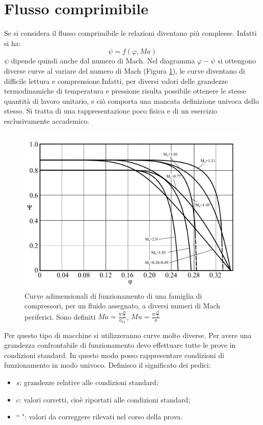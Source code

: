\section{Flusso comprimibile}
Se si considera il flusso comprimibile le relazioni diventano più complesse. Infatti si ha:
\begin{equation}
\psi=f(\varphi,Ma)
\end{equation}
$\psi$ dipende quindi anche dal numero di Mach. 
Nel diagramma $\varphi-\psi$ si ottengono diverse curve al variare del numero di Mach (Figura \ref{fig:ComprMach}), le curve diventano di difficile lettura e comprensione.Infatti, per diversi valori delle grandezze termodinamiche di temperatura e pressione risulta possibile ottenere le stesse quantità di lavoro unitario, e ciò comporta una mancata definizione univoca dello stesso. Si tratta di una rappresentazione poco fisica e di un esercizio esclusivamente accademico.
\begin{figure}[h!]
\centering
  \includegraphics[width=.85\textwidth]{fig/ComprMach.pdf}
\caption{Curve adimensionali di funzionamento di una famiglia di compressori, per un fluido assegnato, a diversi numeri di Mach periferici. Sono definiti $Ma = \frac{w \frac{D}{2}}{a_{01}}$, $Mu = \frac{w \frac{D}{2}}{a}$}
\label{fig:ComprMach}
\end{figure}
Per questo tipo di macchine si utilizzeranno curve molto diverse. Per avere una grandezza confrontabile di funzionamento devo effettuare tutte le prove in condizioni standard. In questo modo posso rappresentare condizioni di funzionamento in modo univoco. 
Definisco il significato dei pedici:
\begin{itemize}
\item $s$: grandezze relative alle condizioni standard;
\item $c$: valori corretti, cioè riportati alle condizioni standard;
\item ``  ": valori da correggere rilevati nel corso della prova.
\end{itemize}
